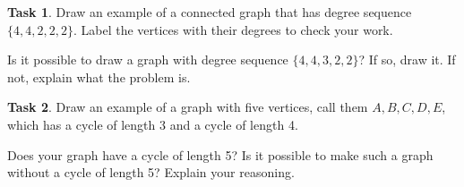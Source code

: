 \documentclass[12pt,letterpaper]{article}
\theoremstyle{definition}
\newtheorem{task}{Task}
\begin{document}
\begin{task}
Draw an example of a connected graph that has degree sequence $\{4,4,2,2,2 \}$. Label the vertices with their degrees to check your work.

Is it possible to draw a graph with degree sequence $\{4,4,3,2,2\}$? If so, draw it. If not, explain what the problem is.
\end{task}

\begin{task}
Draw an example of a graph with five vertices, call them $A, B, C, D, E$, which has a cycle of length 3 and a cycle of length 4.

Does your graph have a cycle of length 5? Is it possible to make such a graph without a cycle of length 5? Explain your reasoning.
\end{task}
\end{document}
